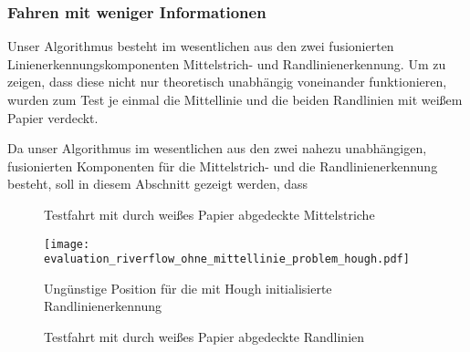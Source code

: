 \subsubsection{Fahren mit weniger Informationen \dcfirstauthorshort}

Unser Algorithmus besteht im wesentlichen aus den zwei fusionierten Linienerkennungskomponenten Mittelstrich- und Randlinienerkennung. Um zu zeigen, dass diese nicht nur theoretisch unabhängig voneinander funktionieren, wurden zum Test je einmal die Mittellinie und die beiden Randlinien mit weißem Papier verdeckt. 

Da unser Algorithmus im wesentlichen aus den zwei nahezu unabhängigen, fusionierten Komponenten für die Mittelstrich- und die Randlinienerkennung besteht, soll in diesem Abschnitt gezeigt werden, dass 






\begin{figure}[htbp] %
	\hfill
	\label{fig:evaluation:riverflow:ohneMittellinie}
	\caption{Testfahrt mit durch weißes Papier abgedeckte Mittelstriche}
\end{figure}



\begin{figure}[htbp] %
	\centering
	\texttt{[image: evaluation\_riverflow\_ohne\_mittellinie\_problem\_hough.pdf]}
	\label{fig:evaluation:riverflow:ohneMittellinie:problem}
	\caption{Ungünstige Position für die mit Hough initialisierte Randlinienerkennung}
\end{figure}


\begin{figure}[htbp] %
	\hfill
	\label{fig:evaluation:riverflow:ohneRandlinie}
	\caption{Testfahrt mit durch weißes Papier abgedeckte Randlinien}
\end{figure}


